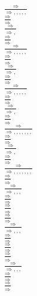 \documentclass[11pt]{article}
\begin{document}
\begin{center}
\bigskip
\\$\frac{\Rightarrow }{\Rightarrow , , , , , }$
\bigskip
\\$\frac{\Rightarrow }{\Rightarrow }$
\bigskip
\\$\frac{\Rightarrow }{\Rightarrow , }$
\bigskip
\\$\frac{\Rightarrow }{\Rightarrow }$
\bigskip
\\$\frac{\Rightarrow }{\Rightarrow , , , , , }$
\bigskip
\\$\frac{\Rightarrow }{\Rightarrow }$
\bigskip
\\$\frac{\Rightarrow }{\Rightarrow , }$
\bigskip
\\$\frac{\Rightarrow }{\Rightarrow }$
\bigskip
\\$\frac{\Rightarrow }{\Rightarrow , , , , , }$
\bigskip
\\$\frac{\Rightarrow }{\Rightarrow }$
\bigskip
\\$\frac{\Rightarrow }{\Rightarrow , }$
\bigskip
\\$\frac{\Rightarrow }{\Rightarrow }$
\bigskip
\\$\frac{\Rightarrow }{\Rightarrow , , , , , , , }$
\bigskip
\\$\frac{\Rightarrow }{\Rightarrow }$
\bigskip
\\$\frac{\Rightarrow }{\Rightarrow , }$
\bigskip
\\$\frac{\Rightarrow }{\Rightarrow }$
\bigskip
\\$\frac{\Rightarrow }{\Rightarrow , , , , , , , }$
\bigskip
\\$\frac{\Rightarrow }{\Rightarrow }$
\bigskip
\\$\frac{\Rightarrow }{\Rightarrow , , , }$
\bigskip
\\$\frac{\Rightarrow }{\Rightarrow }$
\bigskip
\\$\frac{\Rightarrow }{\Rightarrow }$
\bigskip
\\$\frac{\Rightarrow }{\Rightarrow }$
\bigskip
\\$\frac{\Rightarrow }{\Rightarrow , , , }$
\bigskip
\\$\frac{\Rightarrow }{\Rightarrow }$
\bigskip
\\$\frac{\Rightarrow }{\Rightarrow }$
\bigskip
\\$\frac{\Rightarrow }{\Rightarrow }$
\bigskip
\\$\frac{\Rightarrow }{\Rightarrow , , , }$
\bigskip
\\$\frac{\Rightarrow }{\Rightarrow }$
\bigskip
\\$\frac{\Rightarrow }{\Rightarrow }$

\end{center}
\end{document}
